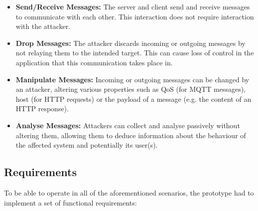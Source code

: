 \begin{itemize}
    \item \textbf{Send/Receive Messages:} The server and client send and receive messages to communicate with each other. This interaction does not require interaction with the attacker.
    \item \textbf{Drop Messages:} The attacker discards incoming or outgoing messages by not relaying them to the intended target. This can cause loss of control in the application that this communication takes place in.
    \item \textbf{Manipulate Messages:} Incoming or outgoing messages can be changed by an attacker, altering various properties such as \ac{QoS} (for \ac{MQTT} messages), host (for \ac{HTTP} requests) or the payload of a message (e.g. the content of an \ac{HTTP} response).
    \item \textbf{Analyse Messages:} Attackers can collect and analyse passively without altering them, allowing them to deduce information about the behaviour of the affected system and potentially its user(s).
\end{itemize}

\subsection{Requirements}
To be able to operate in all of the aforementioned scenarios, the prototype had to implement a set of functional requirements:

